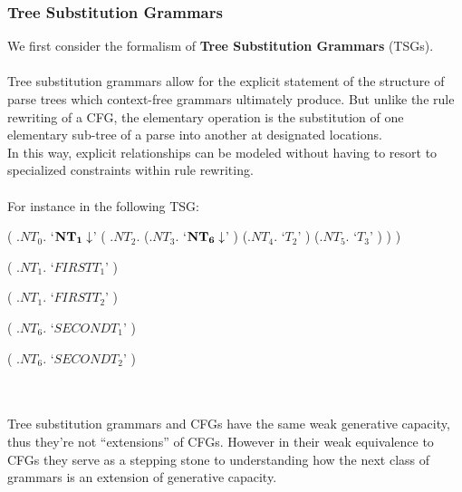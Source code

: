 \documentclass[11pt]{article}
\begin{document}
\subsubsection {Tree Substitution Grammars}
We first consider the formalism of {\bf Tree Substitution Grammars} (TSGs).\\ \\
Tree substitution grammars allow for the explicit statement of the structure of parse trees which context-free grammars ultimately produce.
But unlike the rule rewriting of a CFG, the elementary operation is the substitution of one elementary sub-tree of a parse into another at 
designated locations.\\
In this way, explicit relationships can be modeled without having to resort to specialized constraints within rule rewriting. \\ \\
For instance in the following TSG:\\ 
\begin{parsetree}
    ( .$NT_0$. 
        `${\bf NT_1} \downarrow$'
        ( .$NT_2$.
            (.$NT_3$.    `${\bf NT_6} \downarrow$' )
            (.$NT_4$.    `$T_2$' )
            (.$NT_5$.    `$T_3$' )
         )
    )
\end{parsetree}
\begin{parsetree}
    ( .$NT_1$. 
        `$FIRSTT_1$'
    )
\end{parsetree}
\begin{parsetree}
    ( .$NT_1$. 
        `$FIRSTT_2$'
    )
\end{parsetree}
\begin{parsetree}
    ( .$NT_6$. 
        `$SECONDT_1$'
    )
\end{parsetree}
\begin{parsetree}
    ( .$NT_6$. 
        `$SECONDT_2$'
    )
\end{parsetree}\\ \\
Tree substitution grammars and CFGs have the same weak generative capacity, thus they're not ``extensions'' of CFGs.
However in their weak equivalence to CFGs they serve as a stepping stone to understanding how the next class of grammars is an extension of generative capacity.
\end{document}
